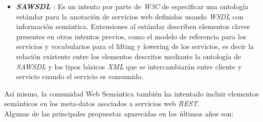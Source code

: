 \begin{itemize}
\item \textbf{\textit{SAWSDL} \cite{sawsdl}}: Es un intento por parte de \textit{W3C} de especificar una ontolog\'ia est\'andar para la anotaci\'on de servicios web definidos usando \textit{WSDL} con informaci\'on sem\'antica. Extensiones al est\'andar describen elementos claves presentes en otros intentos previos, como el modelo de referencia para los servicios y vocabularios para el lifting y lowering de los servicios, es decir la relaci\'on existente entre los elementos descritos mediante la ontolog\'ia de \textit{SAWSDL} y los tipos b\'asicos \textit{XML} que se intercambiar\'an entre cliente y servicio cuando el servicio es consumido.

\end{itemize}

As\'i mismo, la comunidad Web Sem\'antica tambi\'en ha intentado incluir elementos sem\'anticos en los meta-datos asociados a servicios web \textit{REST}.\\
Algunas de las principales propuestas aparecidas en los \'ultimos a\~nos son:

